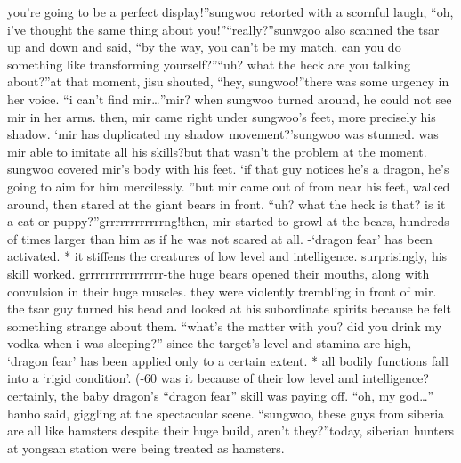  you’re going to be a perfect display!”sungwoo retorted with a scornful laugh, “oh, i’ve thought the same thing about you!”“really?”sunwgoo also scanned the tsar up and down and said, “by the way, you can’t be my match.
 can you do something like transforming yourself?”“uh? what the heck are you talking about?”at that moment, jisu shouted, “hey, sungwoo!”there was some urgency in her voice.
“i can’t find mir…”mir? when sungwoo turned around, he could not see mir in her arms.
then, mir came right under sungwoo’s feet, more precisely his shadow.
‘mir has duplicated my shadow movement?’sungwoo was stunned.
 was mir able to imitate all his skills?but that wasn’t the problem at the moment.
 sungwoo covered mir’s body with his feet.
‘if that guy notices he’s a dragon, he’s going to aim for him mercilessly.
”but mir came out of from near his feet, walked around, then stared at the giant bears in front.
“uh? what the heck is that? is it a cat or puppy?”grrrrrrrrrrrrng!then, mir started to growl at the bears, hundreds of times larger than him as if he was not scared at all.
-‘dragon fear’ has been activated.
* it stiffens the creatures of low level and intelligence.
surprisingly, his skill worked.
grrrrrrrrrrrrrrrr-the huge bears opened their mouths, along with convulsion in their huge muscles.
they were violently trembling in front of mir.
the tsar guy turned his head and looked at his subordinate spirits because he felt something strange about them.
“what’s the matter with you? did you drink my vodka when i was sleeping?”-since the target’s level and stamina are high, ‘dragon fear’ has been applied only to a certain extent.
* all bodily functions fall into a ‘rigid condition’.
 (-60%
was it because of their low level and intelligence? certainly, the baby dragon’s “dragon fear” skill was paying off.
“oh, my god…” hanho said, giggling at the spectacular scene.
“sungwoo, these guys from siberia are all like hamsters despite their huge build, aren’t they?”today, siberian hunters at yongsan station were being treated as hamsters.


